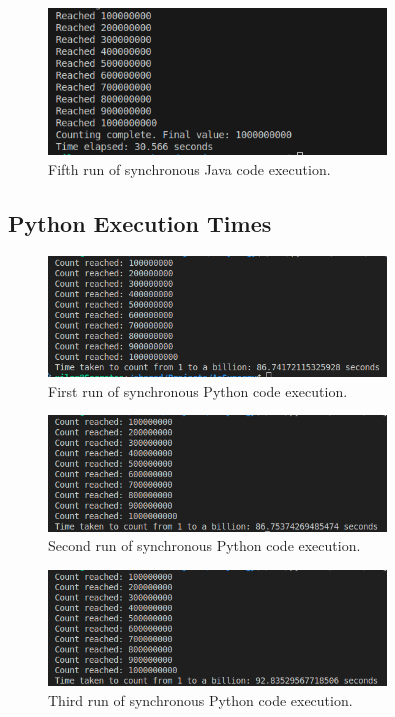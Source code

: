 \documentclass{article}
\begin{document}
\begin{figure}[htbp]
    \centering
    \includegraphics[width=0.8\textwidth]{../records/results_java/result_5.png}
    \caption{Fifth run of synchronous Java code execution.}
    \label{fig:Java-runtime-5}
\end{figure}

\clearpage
\subsection{Python Execution Times} 

\begin{figure}[htbp]
    \centering
    \includegraphics[width=0.8\textwidth]{../records/results_python/result_1.png}
    \caption{First run of synchronous Python code execution.}
    \label{fig:Python-runtime-1}
\end{figure}

\begin{figure}[htbp]
    \centering
    \includegraphics[width=0.8\textwidth]{../records/results_python/result_2.png}
    \caption{Second run of synchronous Python code execution.}
    \label{fig:Python-runtime-2}
\end{figure}

\begin{figure}[htbp]
    \centering
    \includegraphics[width=0.8\textwidth]{../records/results_python/result_3.png}
    \caption{Third run of synchronous Python code execution.}
    \label{fig:Python-runtime-3}
\end{figure}
\end{document}
